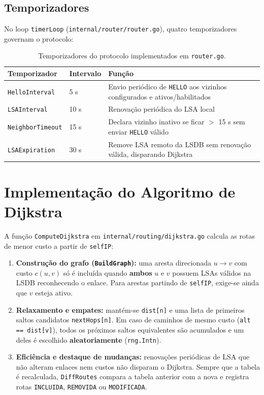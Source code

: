 ﻿\documentclass[11pt,a4paper]{article}
\begin{document}
\subsection{Temporizadores}
No loop \texttt{timerLoop} (\texttt{internal/router/router.go}), quatro temporizadores governam o protocolo:
\begin{table}[H]
\centering
\begin{tabular}{@{}lll@{}}
\toprule
\textbf{Temporizador} & \textbf{Intervalo} & \textbf{Função} \\
\midrule
\texttt{HelloInterval}   & 5 s  & Envio periódico de \texttt{HELLO} aos vizinhos configurados e ativos/habilitados \\
\texttt{LSAInterval}     & 10 s & Renovação periódica do LSA local \\
\texttt{NeighborTimeout} & 15 s & Declara vizinho inativo se ficar $>$ 15 s sem enviar \texttt{HELLO} válido \\
\texttt{LSAExpiration}   & 30 s & Remove LSA remoto da LSDB sem renovação válida, disparando Dijkstra \\
\bottomrule
\end{tabular}
\caption{Temporizadores do protocolo implementados em \texttt{router.go}.}
\end{table}

\section{Implementação do Algoritmo de Dijkstra}

A função \texttt{ComputeDijkstra} em \texttt{internal/routing/dijkstra.go} calcula as rotas de menor custo a partir de \texttt{selfIP}:
\begin{enumerate}
    \item \textbf{Construção do grafo (\texttt{BuildGraph}):} uma aresta direcionada $u \rightarrow v$ com custo $c(u,v)$ só é incluída quando \textbf{ambos} $u$ e $v$ possuem LSAs válidos na LSDB reconhecendo o enlace. Para arestas partindo de \texttt{selfIP}, exige-se ainda que $v$ esteja ativo.
    \item \textbf{Relaxamento e empates:} mantém-se \texttt{dist[n]} e uma lista de primeiros saltos candidatos \texttt{nextHops[n]}. Em caso de caminhos de mesmo custo (\texttt{alt == dist[v]}), todos os próximos saltos equivalentes são acumulados e um deles é escolhido \textbf{aleatoriamente} (\texttt{rng.Intn}).
    \item \textbf{Eficiência e destaque de mudanças:} renovações periódicas de LSA que não alteram enlaces nem custos não disparam o Dijkstra. Sempre que a tabela é recalculada, \texttt{DiffRoutes} compara a tabela anterior com a nova e registra rotas \texttt{INCLUIDA}, \texttt{REMOVIDA} ou \texttt{MODIFICADA}.
\end{enumerate}
\end{document}

